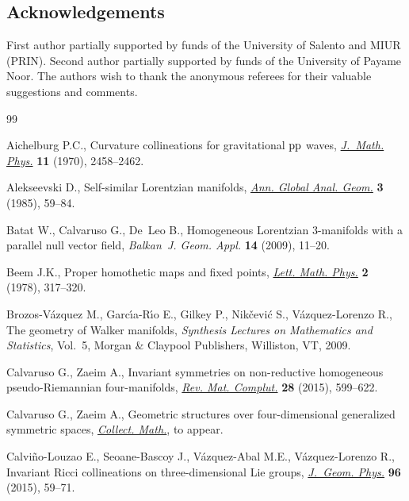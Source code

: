 \documentclass[10pt,a4paper]{amsart}
\numberwithin{equation}{section}
\begin{document}
\subsection*{Acknowledgements}

First author partially supported by funds of the University of Salento and MIUR (PRIN). Second author partially supported by funds of the University of Payame Noor. The authors wish to thank the anonymous referees for their valuable suggestions and comments.


\begin{thebibliography}{99}
\footnotesize\itemsep=-0.5pt

Aichelburg P.C., Curvature collineations for gravitational {${\rm pp}$} waves,
 \href{http://dx.doi.org/10.1063/1.1665410}{\textit{J.~Math. Phys.}} \textbf{11} (1970), 2458--2462.

Alekseevski D., Self-similar {L}orentzian manifolds, \href{http://dx.doi.org/10.1007/BF00054491}{\textit{Ann. Global Anal.
 Geom.}} \textbf{3} (1985), 59--84.

Batat W., Calvaruso G., De~Leo B., Homogeneous {L}orentzian 3-manifolds with a
 parallel null vector f\/ield, \textit{Balkan~J. Geom. Appl.} \textbf{14}
 (2009), 11--20.

Beem J.K., Proper homothetic maps and f\/ixed points, \href{http://dx.doi.org/10.1007/BF00419621}{\textit{Lett. Math. Phys.}}
 \textbf{2} (1978), 317--320.

Brozos-V{\'a}zquez M., Garc{\'{\i}}a-R{\'{\i}}o E., Gilkey P.,
 Nik{\v{c}}evi{\'c} S., V{\'a}zquez-Lorenzo R., The geometry of {W}alker
 manifolds, \textit{Synthesis Lectures on Mathematics and Statistics}, Vol.~5,
 Morgan \& Claypool Publishers, Williston, VT, 2009.

Calvaruso G., Zaeim A., Invariant symmetries on non-reductive homogeneous
 pseudo-{R}iemannian four-manifolds, \href{http://dx.doi.org/10.1007/s13163-015-0168-8}{\textit{Rev. Mat. Complut.}} \textbf{28}
 (2015), 599--622.

Calvaruso G., Zaeim A., Geometric structures over four-dimensional generalized
 symmetric spaces, \href{http://dx.doi.org/10.1007/s13348-016-0173-3}{\textit{Collect. Math.}}, {t}o appear.

Calvi{\~n}o-Louzao E., Seoane-Bascoy J., V{\'a}zquez-Abal M.E.,
 V{\'a}zquez-Lorenzo R., Invariant {R}icci collineations on three-dimensional
 {L}ie groups, \href{http://dx.doi.org/10.1016/j.geomphys.2015.06.005}{\textit{J.~Geom. Phys.}} \textbf{96} (2015), 59--71.


\end{thebibliography}
\end{document}
